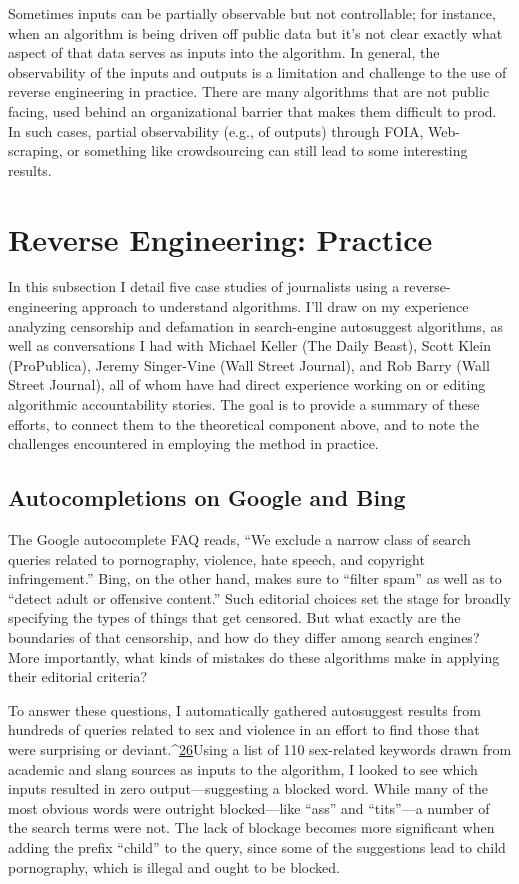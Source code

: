 Sometimes inputs can be partially observable but not controllable; for instance, when an algorithm is being driven off public data but it's not clear exactly what aspect of that data serves as inputs into the algorithm. In general, the observability of the inputs and outputs is a limitation and challenge to the use of reverse engineering in practice. There are many algorithms that are not public facing, used behind an organizational barrier that makes them difficult to prod. In such cases, partial observability (e.g., of outputs) through FOIA, Web-scraping, or something like crowdsourcing can still lead to some interesting results. 

\chapter{Reverse Engineering: Practice }
In this subsection I detail five case studies of journalists using a reverse-engineering approach to understand algorithms. I'll draw on my experience analyzing censorship and defamation in search-engine autosuggest algorithms, as well as conversations I had with Michael Keller (The Daily Beast), Scott Klein (ProPublica), Jeremy Singer-Vine (Wall Street Journal), and Rob Barry (Wall Street Journal), all of whom have had direct experience working on or editing algorithmic accountability stories. The goal is to provide a summary of these efforts, to connect them to the theoretical component above, and to note the challenges encountered in employing the method in practice.

\section{Autocompletions on Google and Bing }
The Google autocomplete FAQ reads, ``We exclude a narrow class of search queries related to pornography, violence, hate speech, and copyright infringement.'' Bing, on the other hand, makes sure to ``filter spam'' as well as to ``detect adult or offensive content.'' Such editorial choices set the stage for broadly specifying the types of things that get censored. But what exactly are the boundaries of that censorship, and how do they differ among search engines? More importantly, what kinds of mistakes do these algorithms make in applying their editorial criteria? 

To answer these questions, I automatically gathered autosuggest results from hundreds of queries related to sex and violence in an effort to find those that were surprising or deviant.^{\href{#endnotes}{26}}Using a list of 110 sex-related keywords drawn from academic and slang sources as inputs to the algorithm, I looked to see which inputs resulted in zero output—suggesting a blocked word. While many of the most obvious words were outright blocked—like ``ass'' and ``tits''—a number of the search terms were not. The lack of blockage becomes more significant when adding the prefix ``child'' to the query, since some of the suggestions lead to child pornography, which is illegal and ought to be blocked. 

